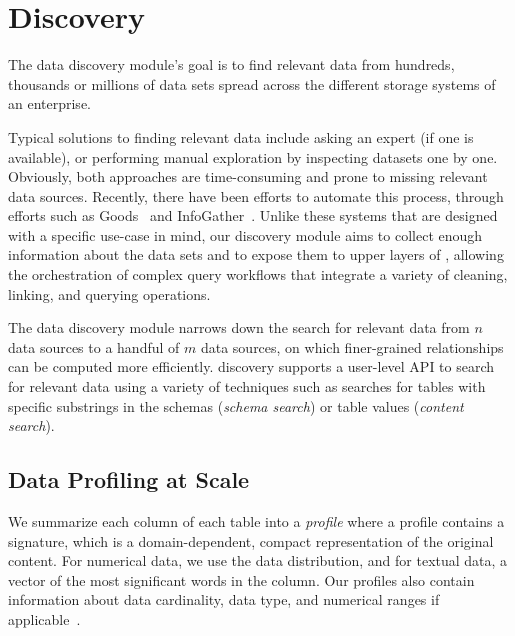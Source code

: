 \section{Discovery}
\label{sec:discovery}

The data discovery module's goal is to find relevant data from hundreds, thousands or
 millions of data sets  spread across the different storage systems of an
enterprise.

Typical solutions to finding relevant data include asking an expert (if one is available), or  performing
manual exploration by inspecting datasets one by one.  Obviously, both approaches are
time-consuming and prone to missing relevant data sources.  
Recently, there have been efforts to automate this process, through efforts such as
Goods~\cite{DBLP:conf/sigmod/HalevyKNOPRW16} and 
InfoGather~\cite{DBLP:conf/sigmod/YakoutGCC12}.   Unlike these systems
that are designed with a specific use-case in mind, our discovery module aims to
collect enough information about the data sets and to expose them to upper layers
of \dcv, allowing the orchestration of complex query workflows that integrate a variety of cleaning, linking, and querying operations.

The data discovery module narrows down the search for relevant data from
$n$ data sources to a handful of $m$ data sources, on which finer-grained relationships can be computed more efficiently.
\dcv discovery supports a user-level API to search for relevant data using a
variety of techniques such as searches for tables with specific substrings in the schemas ({\it schema search}) or table values ({\it content search}). 

\subsection{Data Profiling at Scale}

We summarize each column of each table into a {\em profile}
where a profile contains a signature, which is a domain-dependent,
compact representation of the original content.  For numerical data, we use the
data distribution, and for textual data,  a vector of the most significant words
in the column.  Our profiles also contain information about data cardinality,
data type, and numerical ranges if applicable~\cite{profiling_survey}.

